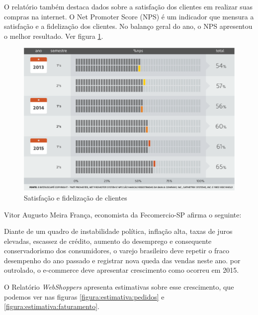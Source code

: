 \documentclass[a4paper,12pt]{monografia}
\begin{document}
O relatório também destaca dados sobre a satisfação dos clientes em realizar suas compras na internet. O Net Promoter Score (NPS) é um indicador que mensura a satisfação e a fidelização dos clientes. No balanço geral do ano, o NPS apresentou o melhor resultado. Ver figura \ref{figura:nps}.

\begin{figure}[H]
\centering
\includegraphics[width=12cm]{img/webshoppers/nps.eps}
\caption{Satisfação e fidelização de clientes}
\label{figura:nps}
\end{figure}

Vitor Augusto Meira França, economista da Fecomercio-SP afirma o seguinte:

\begin{citacao}
	Diante de um quadro de instabilidade política, inflação alta, taxas de juros elevadas, escassez de crédito, aumento do desemprego e consequente conservadorismo dos consumidores, o varejo brasileiro deve repetir o fraco desempenho do ano passado e registrar nova queda das vendas neste ano. por outrolado, o e-commerce deve apresentar crescimento como ocorreu em 2015. \cite{webshoppers}
\end{citacao}

O Relatório \textit{WebShoppers} apresenta estimativas sobre esse crescimento, que podemos ver nas figuras \ref{figura:estimativa:pedidos} e \ref{figura:estimativa:faturamento}.
\end{document}
